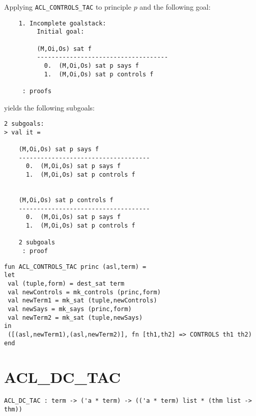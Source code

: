 \EXAMPLE
Applying \texttt{ACL\_CONTROLS\_TAC} to principle $p$ and the following goal:
\begin{holboxed}
\begin{verbatim}
    1. Incomplete goalstack:
         Initial goal:
    
         (M,Oi,Os) sat f
         ------------------------------------
           0.  (M,Oi,Os) sat p says f
           1.  (M,Oi,Os) sat p controls f
    
     : proofs
\end{verbatim}
\end{holboxed}
yields the following subgoals:
\begin{holboxed}
\begin{verbatim}
2 subgoals:
> val it =
    
    (M,Oi,Os) sat p says f
    ------------------------------------
      0.  (M,Oi,Os) sat p says f
      1.  (M,Oi,Os) sat p controls f
    
    
    (M,Oi,Os) sat p controls f
    ------------------------------------
      0.  (M,Oi,Os) sat p says f
      1.  (M,Oi,Os) sat p controls f
    
    2 subgoals
     : proof
\end{verbatim}
\end{holboxed}

\IMPLEMENTATION
\begin{holboxed}
\begin{verbatim}
fun ACL_CONTROLS_TAC princ (asl,term) = 
let
 val (tuple,form) = dest_sat term
 val newControls = mk_controls (princ,form)
 val newTerm1 = mk_sat (tuple,newControls)
 val newSays = mk_says (princ,form)
 val newTerm2 = mk_sat (tuple,newSays)
in
 ([(asl,newTerm1),(asl,newTerm2)], fn [th1,th2] => CONTROLS th1 th2)
end
\end{verbatim}
\end{holboxed}

\SEEALSO
\ENDDOC

\section{ACL\_DC\_TAC}



\small{
\begin{lstlisting}[breaklines]
ACL_DC_TAC : term -> ('a * term) -> (('a * term) list * (thm list -> thm))
\end{lstlisting}}\egroup



